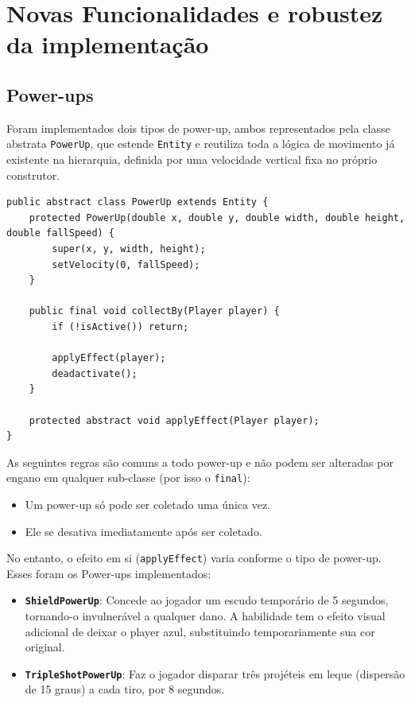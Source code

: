 \section{Novas Funcionalidades e robustez da implementação}


\subsection{Power-ups}

Foram implementados dois tipos de power-up, ambos representados pela classe
abstrata \texttt{PowerUp}, que estende \texttt{Entity} e reutiliza toda a
lógica de movimento já existente na hierarquia, definida por uma velocidade vertical fixa no próprio construtor.

\begin{lstlisting}[caption={\texttt{PowerUp} concentra a coleta em um único método \texttt{final} (PowerUp.java)}]
public abstract class PowerUp extends Entity {
    protected PowerUp(double x, double y, double width, double height, double fallSpeed) {
        super(x, y, width, height);
        setVelocity(0, fallSpeed);
    }

    public final void collectBy(Player player) {
        if (!isActive()) return;

        applyEffect(player);
        deadactivate();
    }

    protected abstract void applyEffect(Player player);
}
\end{lstlisting}

As seguintes regras são comuns a todo power-up e não podem ser alteradas por engano em qualquer sub-classe (por isso o \texttt{final}): 

\begin{itemize}
    \item Um power-up só pode ser coletado uma única vez.
    \item Ele se desativa imediatamente após ser coletado.
\end{itemize}

No entanto, o efeito em si (\texttt{applyEffect}) varia conforme o tipo de power-up. Esses foram os Power-ups implementados:

\begin{itemize}
    \item \textbf{\texttt{ShieldPowerUp}}: Concede ao jogador um escudo
    temporário de 5 segundos, tornando-o invulnerável a qualquer dano. A habilidade
    tem o efeito visual adicional de deixar o player azul, substituindo temporariamente sua cor original.
    \item \textbf{\texttt{TripleShotPowerUp}}: Faz o jogador disparar três
    projéteis em leque (dispersão de 15 graus) a cada tiro, por 8 segundos.
\end{itemize}

